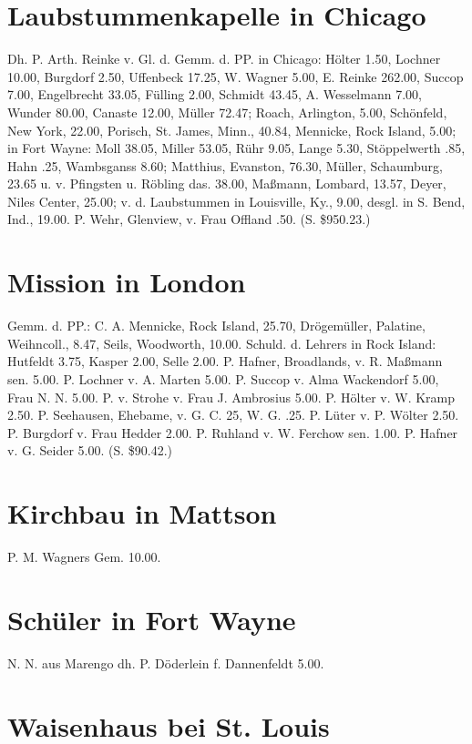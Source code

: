 \section{Laubstummenkapelle in Chicago}

Dh. P. Arth. Reinke v. Gl. d. Gemm. d. PP. in Chicago: Hölter 1.50, Lochner 10.00, Burgdorf 2.50, Uffenbeck 17.25, W. Wagner 5.00, E. Reinke 262.00, Succop 7.00, Engelbrecht 33.05, Fülling 2.00, Schmidt 43.45, A. Wesselmann 7.00, Wunder 80.00, Canaste 12.00, Müller 72.47; Roach, Arlington, 5.00, Schönfeld, New York, 22.00, Porisch, St. James, Minn., 40.84, Mennicke, Rock Island, 5.00; in Fort Wayne: Moll 38.05, Miller 53.05, Rühr 9.05, Lange 5.30, Stöppelwerth .85, Hahn .25, Wambsganss 8.60; Matthius, Evanston, 76.30, Müller, Schaumburg, 23.65 u. v. Pfingsten u. Röbling das. 38.00, Maßmann, Lombard, 13.57, Deyer, Niles Center, 25.00; v. d. Laubstummen in Louisville, Ky., 9.00, desgl. in S. Bend, Ind., 19.00. P. Wehr, Glenview, v. Frau Offland .50. (S. \$950.23.)

\section{Mission in London}

Gemm. d. PP.: C. A. Mennicke, Rock Island, 25.70, Drögemüller, Palatine, Weihncoll., 8.47, Seils, Woodworth, 10.00. Schuld. d. Lehrers in Rock Island: Hutfeldt 3.75, Kasper 2.00, Selle 2.00. P. Hafner, Broadlands, v. R. Maßmann sen. 5.00. P. Lochner v. A. Marten 5.00. P. Succop v. Alma Wackendorf 5.00, Frau N. N. 5.00. P. v. Strohe v. Frau J. Ambrosius 5.00. P. Hölter v. W. Kramp 2.50. P. Seehausen, Ehebame, v. G. C. 25, W. G. .25. P. Lüter v. P. Wölter 2.50. P. Burgdorf v. Frau Hedder 2.00. P. Ruhland v. W. Ferchow sen. 1.00. P. Hafner v. G. Seider 5.00. (S. \$90.42.)

\section{Kirchbau in Mattson}

P. M. Wagners Gem. 10.00.

\section{Schüler in Fort Wayne}

N. N. aus Marengo dh. P. Döderlein f. Dannenfeldt 5.00.

\section{Waisenhaus bei St. Louis}

